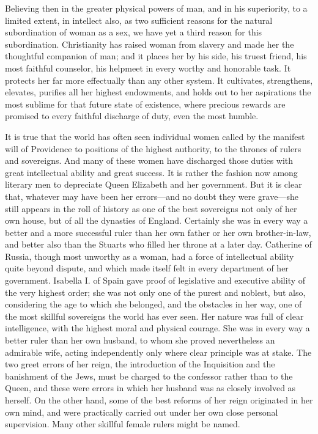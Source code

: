 \begin{linenumbers}
\indent Believing then in the greater physical powers of man, and in his superiority, to a limited extent, in intellect also, as two sufficient reasons for the natural subordination of woman as a sex, we have yet a third reason for this subordination. Christianity has raised woman from slavery and made her the thoughtful companion of man; and it places her by his side, his truest friend, his most faithful counselor, his helpmeet in every worthy and honorable task. It protects her far more effectually than any other system. It cultivates, strengthens, elevates, purifies all her highest endowments, and holds out to her aspirations the most sublime for that future state of existence, where precious rewards are promised to every faithful discharge of duty, even the most humble.

\indent It is true that the world has often seen individual women called by the manifest will of Providence to positions of the highest authority, to the thrones of rulers and sovereigns. And many of these women have discharged those duties with great intellectual ability and great success. It is rather the fashion now among literary men to depreciate Queen Elizabeth and her government. But it is clear that, whatever may have been her errors—and no doubt they were grave—she still appears in the roll of history as one of the best sovereigns not only of her own house, but of all the dynasties of England. Certainly she was in every way a better and a more successful ruler than her own father or her own brother-in-law, and better also than the Stuarts who filled her throne at a later day. Catherine of Russia, though most unworthy as a woman, had a force of intellectual ability quite beyond dispute, and which made itself felt in every department of her government. Isabella I. of Spain gave proof of legislative and executive ability of the very highest order; she was not only one of the purest and noblest, but also, considering the age to which she belonged, and the obstacles in her way, one of the most skillful sovereigns the world has ever seen. Her nature was full of clear intelligence, with the highest moral and physical courage. She was in every way a better ruler than her own husband, to whom she proved nevertheless an admirable wife, acting independently only where clear principle was at stake. The two greet errors of her reign, the introduction of the Inquisition and the banishment of the Jews, must be charged to the confessor rather than to the Queen, and these were errors in which her husband was as closely involved as herself. On the other hand, some of the best reforms of her reign originated in her own mind, and were practically carried out under her own close personal supervision. Many other skillful female rulers might be named. 


\end{linenumbers}
